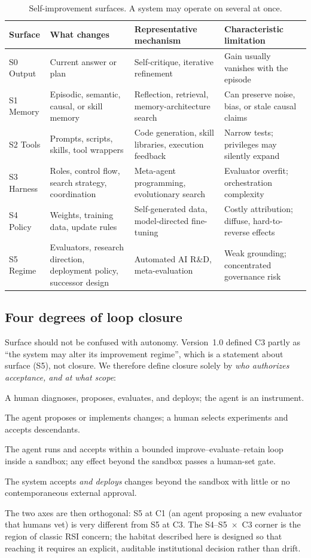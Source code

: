 \documentclass[11pt,a4paper]{article}
\begin{document}
\begin{table}[t]
\centering\small
\caption{Self-improvement surfaces. A system may operate on several at once.}
\label{tab:surfaces}
\begin{tabularx}{\linewidth}{@{}P{2.1cm}P{2.9cm}LL@{}}
\toprule
Surface & What changes & Representative mechanism & Characteristic limitation\\
\midrule
S0 Output & Current answer or plan & Self-critique, iterative refinement & Gain usually vanishes with the episode\\
S1 Memory & Episodic, semantic, causal, or skill memory & Reflection, retrieval, memory-architecture search & Can preserve noise, bias, or stale causal claims\\
S2 Tools & Prompts, scripts, skills, tool wrappers & Code generation, skill libraries, execution feedback & Narrow tests; privileges may silently expand\\
S3 Harness & Roles, control flow, search strategy, coordination & Meta-agent programming, evolutionary search & Evaluator overfit; orchestration complexity\\
S4 Policy & Weights, training data, update rules & Self-generated data, model-directed fine-tuning & Costly attribution; diffuse, hard-to-reverse effects\\
S5 Regime & Evaluators, research direction, deployment policy, successor design & Automated AI R\&D, meta-evaluation & Weak grounding; concentrated governance risk\\
\bottomrule
\end{tabularx}
\end{table}

\subsection{Four degrees of loop closure}\label{sec:closure}
Surface should not be confused with autonomy. Version~1.0 defined C3 partly as ``the system may alter its improvement regime'', which is a statement about surface (S5), not closure. We therefore define closure solely by \emph{who authorizes acceptance, and at what scope}:
\begin{description}[leftmargin=2.4em,labelwidth=2em,itemsep=2pt]
\item[C0] A human diagnoses, proposes, evaluates, and deploys; the agent is an instrument.
\item[C1] The agent proposes or implements changes; a human selects experiments and accepts descendants.
\item[C2] The agent runs and accepts within a bounded improve--evaluate--retain loop inside a sandbox; any effect beyond the sandbox passes a human-set gate.
\item[C3] The system accepts \emph{and deploys} changes beyond the sandbox with little or no contemporaneous external approval.
\end{description}
The two axes are then orthogonal: S5 at C1 (an agent proposing a new evaluator that humans vet) is very different from S5 at C3. The S4--S5~$\times$~C3 corner is the region of classic RSI concern; the habitat described here is designed so that reaching it requires an explicit, auditable institutional decision rather than drift.
\end{document}
